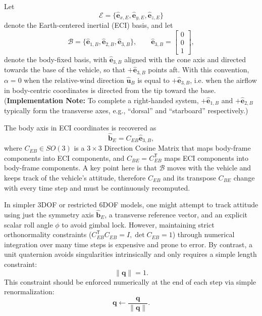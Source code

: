 Let
\begin{equation}
\mathcal E=\{\hat{\mathbf e}_{x,E},\hat{\mathbf e}_{y,E},\hat{\mathbf e}_{z,E}\}
\end{equation}
denote the Earth-centered inertial (ECI) basis, and let
\begin{equation}
\mathcal B=\{\hat{\mathbf e}_{1,B},\hat{\mathbf e}_{2,B},\hat{\mathbf e}_{3,B}\},
\qquad
\hat{\mathbf e}_{3,B}=
\begin{bmatrix}
0\\[2pt]0\\[2pt]1
\end{bmatrix},
\end{equation}
denote the body-fixed basis, with \(\hat{\mathbf e}_{3,B}\) aligned with the cone axis and directed towards the base of the vehicle, so that \(+\hat{\mathbf e}_{3,B}\) points aft. With this convention, \(\alpha=0\) when the relative-wind direction \(\hat{\mathbf u}_B\) is equal to \(+\hat{\mathbf e}_{3,B}\), i.e. when the airflow in body-centric coordinates is directed from the tip toward the base. (\textbf{Implementation Note:} To complete a right-handed system, \(+\hat{\mathbf e}_{1,B}\) and \(+\hat{\mathbf e}_{2,B}\) typically form the transverse axes, e.g., ``dorsal'' and ``starboard'' respectively.) 

The body axis in ECI coordinates is recovered as
\begin{equation}
\hat{\mathbf b}_E = C_{EB}\hat{\mathbf e}_{3,B}, \label{eq:body_axis_eci}
\end{equation}
where \(C_{EB}\in SO(3)\) is a \(3\times3\) Direction Cosine Matrix that maps body-frame components into ECI components, and \(C_{BE}=C_{EB}^{\mathsf T}\) maps ECI components into body-frame components. A key point here is that \(\mathcal B\) moves with the vehicle and keeps track of the vehicle's attitude, therefore \(C_{EB}\) and its transpose \(C_{BE}\) change with every time step and must be continuously recomputed. 

In simpler 3DOF or restricted 6DOF models, one might attempt to track attitude using just the symmetry axis $\hat{\mathbf b}_E$, a transverse reference vector, and an explicit scalar roll angle \(\phi\) to avoid gimbal lock. However, maintaining strict orthonormality constraints ($C_{EB}^{\mathsf T}C_{EB}=I, \det C_{EB} =1$) through numerical integration over many time steps is expensive and prone to error. By contrast, a unit quaternion avoids singularities intrinsically and only requires a simple length constraint:
\begin{equation}
\|\mathbf q\| = 1.
\end{equation}
This constraint should be enforced numerically at the end of each step via simple renormalization:
\begin{equation}
\mathbf q \leftarrow \frac{\mathbf q}{\|\mathbf q\|}. \label{eq:quat_renorm}
\end{equation}

